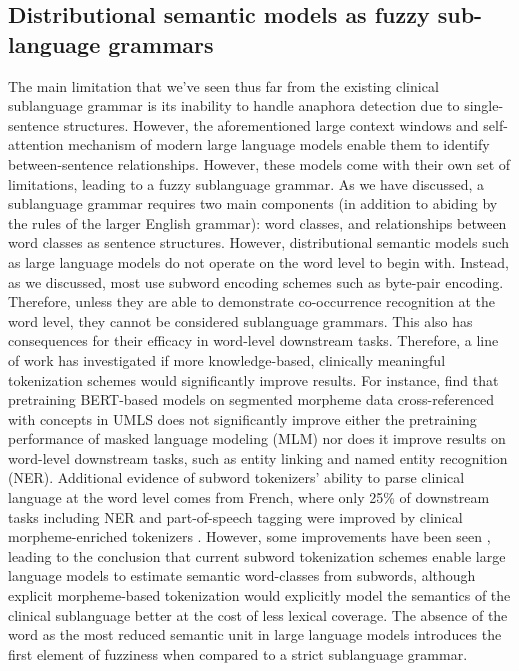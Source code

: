\subsection{Distributional semantic models as fuzzy sub-language grammars}
The main limitation that we've seen thus far from the existing clinical sublanguage grammar is its inability to handle anaphora detection due to single-sentence structures. However, the aforementioned large context windows and self-attention mechanism of modern large language models enable them to identify between-sentence relationships. However, these models come with their own set of limitations, leading to a fuzzy sublanguage grammar. As we have discussed, a sublanguage grammar requires two main components (in addition to abiding by the rules of the larger English grammar): word classes, and relationships between word classes as sentence structures. However, distributional semantic models such as large language models do not operate on the word level to begin with. Instead, as we discussed, most use subword encoding schemes such as byte-pair encoding. Therefore, unless they are able to demonstrate co-occurrence recognition at the word level, they cannot be considered sublanguage grammars. This also has consequences for their efficacy in word-level downstream tasks. Therefore, a line of work has investigated if more knowledge-based, clinically meaningful tokenization schemes would significantly improve results. For instance, \citet{jimenezgutierrezBiomedicalLanguageModels2023} find that pretraining BERT-based models on segmented morpheme data cross-referenced with concepts in UMLS does not significantly improve either the pretraining performance of masked language modeling (MLM) nor does it improve results on word-level downstream tasks, such as entity linking and named entity recognition (NER). Additional evidence of subword tokenizers' ability to parse clinical language at the word level comes from French, where only 25\% of downstream tasks including NER and part-of-speech tagging were improved by clinical morpheme-enriched tokenizers \citet{labrak-etal-2024-important}. However, some improvements have been seen \citet{hasanInfusingClinicalKnowledge2024}, leading to the conclusion that current subword tokenization schemes enable large language models to estimate semantic word-classes from subwords, although explicit morpheme-based tokenization would explicitly model the semantics of the clinical sublanguage better at the cost of less lexical coverage. The absence of the word as the most reduced semantic unit in large language models introduces the first element of fuzziness when compared to a strict sublanguage grammar.

